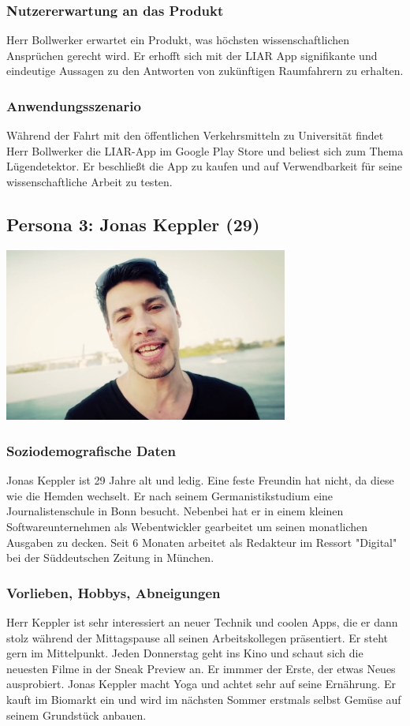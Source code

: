 \documentclass[10pt, a4paper, oneside, titlepage]{scrartcl} %
\begin{document}
	\subsubsection{Nutzererwartung an das Produkt}
	Herr Bollwerker erwartet ein Produkt, was höchsten wissenschaftlichen Ansprüchen gerecht wird. Er erhofft sich mit der LIAR App signifikante und eindeutige Aussagen zu den Antworten von zukünftigen Raumfahrern zu erhalten.
	\subsubsection{Anwendungsszenario}
	Während der Fahrt mit den öffentlichen Verkehrsmitteln zu Universität findet Herr Bollwerker die LIAR-App im Google Play Store und beliest sich zum Thema Lügendetektor. Er beschließt die App zu kaufen und auf Verwendbarkeit für seine wissenschaftliche Arbeit zu testen.
	
	\subsection{Persona 3: Jonas Keppler (29)}
	\begin{center}
		\includegraphics[width=0.7\textwidth]{persona_03.jpg}
	\end{center}
	\subsubsection{Soziodemografische Daten}
	Jonas Keppler ist 29 Jahre alt und ledig. Eine feste Freundin hat nicht, da diese wie die Hemden wechselt. Er nach seinem Germanistikstudium eine Journalistenschule in Bonn besucht. Nebenbei hat er in einem kleinen Softwareunternehmen als Webentwickler gearbeitet um seinen monatlichen Ausgaben zu decken. Seit 6 Monaten arbeitet als Redakteur im Ressort "Digital" bei der Süddeutschen Zeitung in München.
	\subsubsection{Vorlieben, Hobbys, Abneigungen}
	Herr Keppler ist sehr interessiert an neuer Technik und coolen Apps, die er dann stolz während der Mittagspause all seinen Arbeitskollegen präsentiert. Er 	steht gern im Mittelpunkt. Jeden Donnerstag geht ins Kino und schaut sich die neuesten Filme in der Sneak Preview an. Er immmer der Erste, der etwas Neues ausprobiert. Jonas Keppler macht Yoga und achtet sehr auf seine Ernährung. Er kauft im Biomarkt ein und wird im nächsten Sommer erstmals selbst Gemüse auf seinem Grundstück anbauen.
\end{document}
